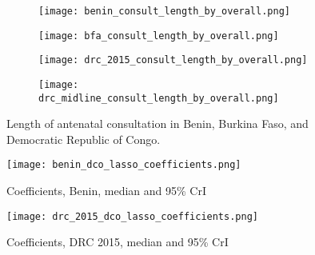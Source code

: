 \documentclass{article}
\begin{document}
\begin{figure}[p]
  \centering
  \begin{subfigure}[b]{0.45\textwidth}
    \texttt{[image: benin\_consult\_length\_by\_overall.png]}
    \subcaption{}
  \end{subfigure}   
  \hfill 
  \begin{subfigure}[b]{0.45\textwidth}
    \texttt{[image: bfa\_consult\_length\_by\_overall.png]}
    \subcaption{}
  \end{subfigure}

  \begin{subfigure}[b]{0.45\textwidth}
    \texttt{[image: drc\_2015\_consult\_length\_by\_overall.png]}
    \subcaption{}
  \end{subfigure}
  \hfill
  \begin{subfigure}[b]{0.45\textwidth}
    \texttt{[image: drc\_midline\_consult\_length\_by\_overall.png]}
    \subcaption{}
  \end{subfigure}   
  \caption{Length of antenatal consultation in Benin, Burkina Faso, and Democratic Republic of Congo.}
  \label{fig:anc length}
\end{figure}


\begin{figure}[p]
  \centering
  \texttt{[image: benin\_dco\_lasso\_coefficients.png]}
  \caption{Coefficients, Benin, median and 95\% CrI}
  \label{fig:benin dco lm}
\end{figure}


\begin{figure}[p]
  \centering
    \texttt{[image: drc\_2015\_dco\_lasso\_coefficients.png]}
  \caption{Coefficients, DRC 2015, median and 95\% CrI}
  \label{fig:drc 2015 dco lm}
\end{figure} 
\end{document}
